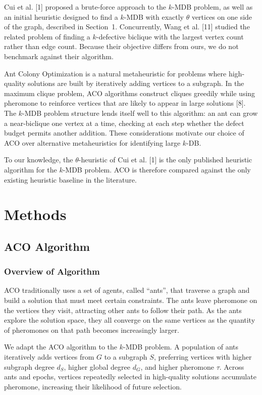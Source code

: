 \documentclass[conference]{IEEEtran}
\begin{document}
Cui et al. [1] proposed a brute-force approach to the $k$-MDB problem, as well as an initial heuristic designed to find a $k$-MDB with exactly $\theta$ vertices on one side of the graph, described in Section~1. Concurrently, Wang et al. [11] studied the related problem of finding a $k$-defective biclique with the largest vertex count rather than edge count. Because their objective differs from ours, we do not benchmark against their algorithm.


Ant Colony Optimization is a natural metaheuristic for problems where high-quality solutions are built by iteratively adding vertices to a subgraph. In the maximum clique problem, ACO algorithms construct cliques greedily while using pheromone to reinforce vertices that are likely to appear in large solutions [8]. The $k$-MDB problem structure lends itself well to this algorithm: an ant can grow a near-biclique one vertex at a time, checking at each step whether the defect budget permits another addition. These considerations motivate our choice of ACO over alternative metaheuristics for identifying large $k$-DB.


To our knowledge, the $\theta$-heuristic of Cui et al. [1] is the only published heuristic algorithm for the $k$-MDB problem. ACO is therefore compared against the only existing heuristic baseline in the literature.


\section{Methods}


\subsection{ACO Algorithm}


\subsubsection{Overview of Algorithm}


ACO traditionally uses a set of agents, called ``ants'', that traverse a graph and build a solution that must meet certain constraints. The ants leave pheromone on the vertices they visit, attracting other ants to follow their path. As the ants explore the solution space, they all converge on the same vertices as the quantity of pheromones on that path becomes increasingly larger.


We adapt the ACO algorithm to the $k$-MDB problem. A population of ants iteratively adds vertices from $G$ to a subgraph $S$, preferring vertices with higher subgraph degree $d_S$, higher global degree $d_G$, and higher pheromone $\tau$. Across ants and epochs, vertices repeatedly selected in high-quality solutions accumulate pheromone, increasing their likelihood of future selection.
\end{document}
